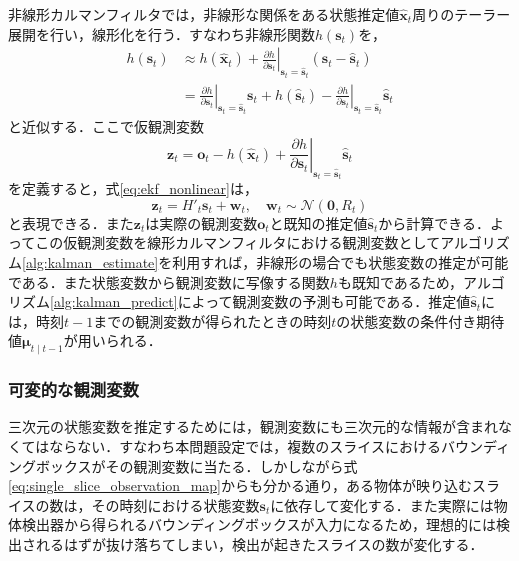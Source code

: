         非線形カルマンフィルタでは，非線形な関係をある状態推定値$\hat{\bm{x}}_t$周りのテーラー展開を行い，線形化を行う．すなわち非線形関数$h(\bm{s}_t)$を，
        \begin{equation}
            \label{eq:ekf_linearization}
            \begin{aligned}
                h(\bm{s}_t) &\approx h(\hat{\bm{x}}_t) + \left.\frac{\partial h}{\partial \bm{s}_t}\right|_{\bm{s}_t = \hat{\bm{s}}_t} (\bm{s}_t - \hat{\bm{s}}_t)
                \\ &= \left.\frac{\partial h}{\partial \bm{s}_t}\right|_{\bm{s}_t = \hat{\bm{s}}_t} \bm{s}_t + h(\hat{\bm{s}}_t) - \left.\frac{\partial h}{\partial \bm{s}_t}\right|_{\bm{s}_t = \hat{\bm{s}}_t} \hat{\bm{s}}_t
            \end{aligned}
        \end{equation}
        と近似する．ここで仮観測変数
        \begin{equation}
            \label{eq:ekf_new_observation}
            \bm{z}_t = \bm{o}_t - h(\hat{\bm{x}}_t) + \left.\frac{\partial h}{\partial \bm{s}_t}\right|_{\bm{s}_t = \hat{\bm{s}}_t} \hat{\bm{s}}_t
        \end{equation}
        を定義すると，式\ref{eq:ekf_nonlinear}は，
        \begin{equation}
            \label{eq:ekf_linearization_with_z}
            \bm{z}_t = H'_t \bm{s}_t + \bm{w}_t, \quad \bm{w}_t \sim \mathcal{N}(\bm{0}, R_t) 
        \end{equation}
        と表現できる．また$\bm{z}_t$は実際の観測変数$\bm{o}_t$と既知の推定値$\hat{\bm{s}}_t$から計算できる．よってこの仮観測変数を線形カルマンフィルタにおける観測変数としてアルゴリズム\ref{alg:kalman_estimate}を利用すれば，非線形の場合でも状態変数の推定が可能である．また状態変数から観測変数に写像する関数$h$も既知であるため，アルゴリズム\ref{alg:kalman_predict}によって観測変数の予測も可能である．推定値$\hat{\bm{s}}_t$には，時刻$t-1$までの観測変数が得られたときの時刻$t$の状態変数の条件付き期待値$\bm{\mu}_{t \mid t-1}$が用いられる．

            \subsubsection{可変的な観測変数}

            三次元の状態変数を推定するためには，観測変数にも三次元的な情報が含まれなくてはならない．すなわち本問題設定では，複数のスライスにおけるバウンディングボックスがその観測変数に当たる．しかしながら式\ref{eq:single_slice_observation_map}からも分かる通り，ある物体が映り込むスライスの数は，その時刻における状態変数$\bm{s}_t$に依存して変化する．また実際には物体検出器から得られるバウンディングボックスが入力になるため，理想的には検出されるはずが抜け落ちてしまい，検出が起きたスライスの数が変化する．

